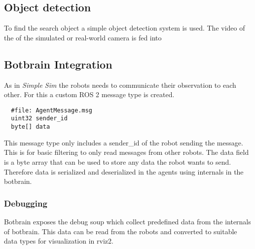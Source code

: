\subsection{Object detection}\label{sub:object_detection}
To find the search object a simple object detection system is used. The video of the of the simulated or real-world camera is fed into

\subsection{Botbrain Integration}\label{sub:botbrain_integration}
As in \textit{Simple Sim} the robots needs to communicate their observation to each other. For this a custom ROS 2 message type is created. 
\begin{verbatim}
  #file: AgentMessage.msg
  uint32 sender_id
  byte[] data
\end{verbatim}
This message type only includes a sender\_id of the robot sending the message. This is for basic filtering to only read messages from other robots.
The data field is a byte array that can be used to store any data the robot wants to send. Therefore data is serialized and deserialized in the agents using internals in the botbrain.

\subsubsection{Debugging}\label{sec:debugging_rviz}
Botbrain exposes the debug soup which collect predefined data from the internals of botbrain. This data can be read from the robots and converted to suitable data types for visualization in rviz2.
